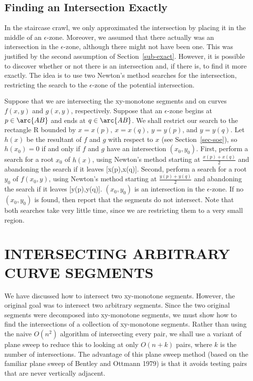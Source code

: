 \subsection{Finding an Intersection Exactly}
\label{sub-exact2}

In the staircase crawl, we only approximated the intersection by placing it in the middle
of an $\epsilon$-zone.
Moreover, we assumed that there actually was an intersection in the $\epsilon$-zone, although
there might not have been one.
This was justified by the second assumption of Section~\ref{sub-exact}.
However, it is possible to discover whether or not there is an intersection and, if there is,
to find it more exactly.
The idea is to use two Newton's method searches for the intersection, restricting the search
to the $\epsilon$-zone of the potential intersection.

Suppose that we are intersecting the xy-monotone segments  and  on curves
$f(x,y)$ and $g(x,y)$, respectively.
Suppose that an $\epsilon$-zone begins at $p \in \arc{AB}$ and ends at $q \in \arc{AB}$.
We shall restrict our search to the rectangle R bounded by $x = x(p),\ x = x(q),\ y = y(p)$,
and $y = y(q)$.
Let $h(x)$ be the resultant of $f$ and $g$ with respect to $x$ (see Section~\ref{sec-soe}),
so $h(x_{0}) = 0$ if and only if $f$ and $g$ have an intersection $(x_{0},y_{0})$.
First, perform a search for a root $x_{0}$ of $h(x)$, using Newton's method starting at
$\frac{x(p)+x(q)}{2}$ and abandoning the search if it leaves [x(p),x(q)].
Second, perform a search for a root $y_{0}$ of $f(x_{0},y)$, using Newton's method starting at
$\frac{y(p)+y(q)}{2}$ and abandoning the search if it leaves [y(p),y(q)].
$(x_{0},y_{0})$ is an intersection in the $\epsilon$-zone.
If no $(x_{0},y_{0})$ is found, then report that the segments do not intersect.
Note that both searches take very little time, since we are restricting them to a very
small region.

\section{INTERSECTING ARBITRARY CURVE SEGMENTS}
\label{sec-sweep}

We have discussed how to intersect two xy-monotone segments.
However, the original goal was to intersect two arbitrary segments.
Since the two original segments were decomposed into xy-monotone segments, we must show
how to find the intersections of a collection of xy-monotone segments.
Rather than using the naive $O(n^{2})$ algorithm of intersecting every pair, 
we shall use a variant of plane sweep to reduce this to looking at only $O(n + k)$ pairs,
where $k$ is the number of intersections.
The advantage of this plane sweep method (based on the familiar plane sweep of Bentley 
and Ottmann 1979) is that it avoids testing pairs that are never vertically adjacent.

